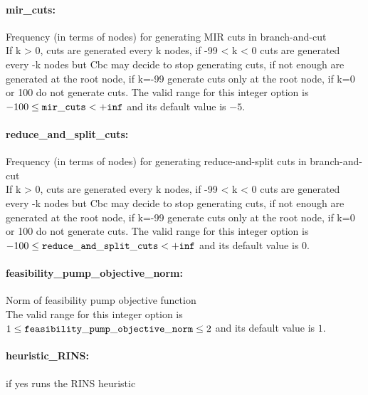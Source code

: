 \paragraph{mir\_cuts:}\label{sec:mir_cuts} Frequency (in terms of nodes) for generating MIR cuts in branch-and-cut $\;$ \\
 If k > 0, cuts are generated every k nodes, if
-99 < k < 0 cuts are generated every -k nodes but
Cbc may decide to stop generating cuts, if not
enough are generated at the root node, if k=-99
generate cuts only at the root node, if k=0 or
100 do not generate cuts. The valid range for this integer option is
$-100 \le {\tt mir\_cuts } <  {\tt +inf}$
and its default value is $-5$.


\paragraph{reduce\_and\_split\_cuts:}\label{sec:reduce_and_split_cuts} Frequency (in terms of nodes) for generating reduce-and-split cuts in branch-and-cut $\;$ \\
 If k > 0, cuts are generated every k nodes, if
-99 < k < 0 cuts are generated every -k nodes but
Cbc may decide to stop generating cuts, if not
enough are generated at the root node, if k=-99
generate cuts only at the root node, if k=0 or
100 do not generate cuts. The valid range for this integer option is
$-100 \le {\tt reduce\_and\_split\_cuts } <  {\tt +inf}$
and its default value is $0$.


\paragraph{feasibility\_pump\_objective\_norm:}\label{sec:feasibility_pump_objective_norm} Norm of feasibility pump objective function $\;$ \\
 The valid range for this integer option is
$1 \le {\tt feasibility\_pump\_objective\_norm } \le 2$
and its default value is $1$.


\paragraph{heuristic\_RINS:}\label{sec:heuristic_RINS} if yes runs the RINS heuristic $\;$ \\

